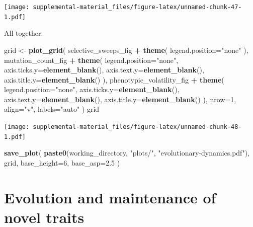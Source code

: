 \documentclass[]{book}
\newenvironment{Shaded}{\begin{snugshade}}{\end{snugshade}}
\newcommand{\DataTypeTok}[1]{\textcolor[rgb]{0.13,0.29,0.53}{#1}}
\newcommand{\DecValTok}[1]{\textcolor[rgb]{0.00,0.00,0.81}{#1}}
\newcommand{\FloatTok}[1]{\textcolor[rgb]{0.00,0.00,0.81}{#1}}
\newcommand{\KeywordTok}[1]{\textcolor[rgb]{0.13,0.29,0.53}{\textbf{#1}}}
\newcommand{\NormalTok}[1]{#1}
\newcommand{\OperatorTok}[1]{\textcolor[rgb]{0.81,0.36,0.00}{\textbf{#1}}}
\newcommand{\StringTok}[1]{\textcolor[rgb]{0.31,0.60,0.02}{#1}}
\begin{document}
\texttt{[image: supplemental-material\_files/figure-latex/unnamed-chunk-47-1.pdf]}

All together:

\begin{Shaded}
\begin{Highlighting}[]
\NormalTok{grid <-}\StringTok{ }\KeywordTok{plot_grid}\NormalTok{(}
\NormalTok{  selective_sweeps_fig }\OperatorTok{+}\StringTok{ }\KeywordTok{theme}\NormalTok{(}
    \DataTypeTok{legend.position=}\StringTok{"none"}
\NormalTok{  ),}
\NormalTok{  mutation_count_fig }\OperatorTok{+}\StringTok{ }\KeywordTok{theme}\NormalTok{(}
    \DataTypeTok{legend.position=}\StringTok{"none"}\NormalTok{,}
    \DataTypeTok{axis.ticks.y=}\KeywordTok{element_blank}\NormalTok{(),}
    \DataTypeTok{axis.text.y=}\KeywordTok{element_blank}\NormalTok{(),}
    \DataTypeTok{axis.title.y=}\KeywordTok{element_blank}\NormalTok{()}
\NormalTok{  ),}
\NormalTok{  phenotypic_volatility_fig }\OperatorTok{+}\StringTok{ }\KeywordTok{theme}\NormalTok{(}
    \DataTypeTok{legend.position=}\StringTok{"none"}\NormalTok{,}
    \DataTypeTok{axis.ticks.y=}\KeywordTok{element_blank}\NormalTok{(),}
    \DataTypeTok{axis.text.y=}\KeywordTok{element_blank}\NormalTok{(),}
    \DataTypeTok{axis.title.y=}\KeywordTok{element_blank}\NormalTok{()}
\NormalTok{  ),}
  \DataTypeTok{nrow=}\DecValTok{1}\NormalTok{,}
  \DataTypeTok{align=}\StringTok{"v"}\NormalTok{,}
  \DataTypeTok{labels=}\StringTok{"auto"}
\NormalTok{)}
\NormalTok{grid}
\end{Highlighting}
\end{Shaded}

\texttt{[image: supplemental-material\_files/figure-latex/unnamed-chunk-48-1.pdf]}

\begin{Shaded}
\begin{Highlighting}[]
\KeywordTok{save_plot}\NormalTok{(}
   \KeywordTok{paste0}\NormalTok{(working_directory, }\StringTok{"plots/"}\NormalTok{, }\StringTok{"evolutionary-dynamics.pdf"}\NormalTok{),}
\NormalTok{   grid,}
   \DataTypeTok{base_height=}\DecValTok{6}\NormalTok{,}
   \DataTypeTok{base_asp=}\FloatTok{2.5}
\NormalTok{)}
\end{Highlighting}
\end{Shaded}

\hypertarget{evolution-and-maintenance-of-novel-traits}{%
\chapter{Evolution and maintenance of novel traits}\label{evolution-and-maintenance-of-novel-traits}}
\end{document}
